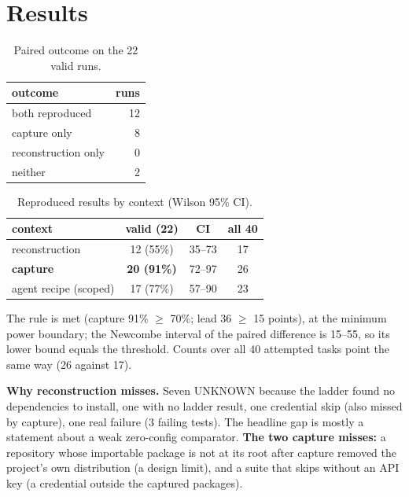 \documentclass[10pt,conference]{IEEEtran}
\begin{document}
\section{Results}
\begin{table}[h]
\centering\caption{Paired outcome on the 22 valid runs.}
\begin{tabular}{lr}\toprule outcome & runs\\\midrule both reproduced & 12\\ capture only & 8\\ reconstruction only & 0\\ neither & 2\\\bottomrule\end{tabular}
\end{table}
\begin{table}[h]
\centering\caption{Reproduced results by context (Wilson 95\% CI).}
\begin{tabular}{lccc}\toprule context & valid (22) & CI & all 40\\\midrule
reconstruction & 12 (55\%) & 35--73 & 17\\
\textbf{capture} & \textbf{20 (91\%)} & 72--97 & 26\\
agent recipe (scoped) & 17 (77\%) & 57--90 & 23\\\bottomrule\end{tabular}
\end{table}
The rule is met (capture 91\% $\ge$ 70\%; lead 36 $\ge$ 15 points), at the minimum power boundary; the Newcombe interval of the paired difference is 15--55, so its lower bound equals the threshold. Counts over all 40 attempted tasks point the same way (26 against 17).

\textbf{Why reconstruction misses.} Seven UNKNOWN because the ladder found no dependencies to install, one with no ladder result, one credential skip (also missed by capture), one real failure (3 failing tests). The headline gap is mostly a statement about a weak zero-config comparator. \textbf{The two capture misses:} a repository whose importable package is not at its root after capture removed the project's own distribution (a design limit), and a suite that skips without an API key (a credential outside the captured packages).
\end{document}
